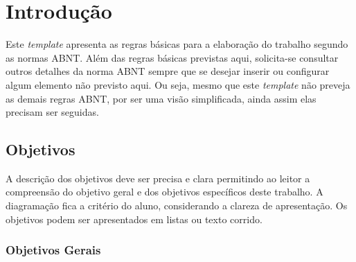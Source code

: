 \chapter{Introdução}\label{cap1}

Este \textit{template} apresenta as regras básicas para a elaboração do trabalho segundo as normas ABNT. Além das regras básicas previstas aqui, solicita-se consultar outros detalhes da norma ABNT sempre que se desejar inserir ou configurar algum elemento não previsto aqui. Ou seja, mesmo que este \textit{template} não preveja as demais regras ABNT, por ser uma visão simplificada, ainda assim elas precisam ser seguidas. 

\section{Objetivos}\label{cap11}

A descrição dos objetivos deve ser precisa e clara permitindo ao leitor a compreensão do objetivo geral e dos objetivos específicos deste trabalho. A diagramação fica a critério do aluno, considerando a clareza de apresentação. Os objetivos podem ser apresentados em listas ou texto corrido.

\subsection{Objetivos Gerais}

